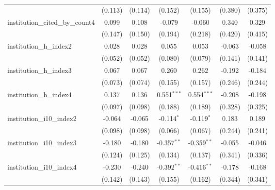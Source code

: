 \begin{tabular}{lcccccc}
                                         & (0.113)        & (0.114)        & (0.152)       & (0.155)       & (0.380)      & (0.375)\\   
   institution\_cited\_by\_count4        & 0.099          & 0.108          & -0.079        & -0.060        & 0.340        & 0.329\\   
                                         & (0.147)        & (0.150)        & (0.194)       & (0.218)       & (0.420)      & (0.415)\\   
   institution\_h\_index2                & 0.028          & 0.028          & 0.055         & 0.053         & -0.063       & -0.058\\   
                                         & (0.052)        & (0.052)        & (0.080)       & (0.079)       & (0.141)      & (0.141)\\   
   institution\_h\_index3                & 0.067          & 0.067          & 0.260         & 0.262         & -0.192       & -0.184\\   
                                         & (0.073)        & (0.074)        & (0.155)       & (0.157)       & (0.246)      & (0.244)\\   
   institution\_h\_index4                & 0.137          & 0.136          & 0.551$^{***}$ & 0.554$^{***}$ & -0.208       & -0.198\\   
                                         & (0.097)        & (0.098)        & (0.188)       & (0.189)       & (0.328)      & (0.325)\\   
   institution\_i10\_index2              & -0.064         & -0.065         & -0.114$^{*}$  & -0.119$^{*}$  & 0.183        & 0.189\\   
                                         & (0.098)        & (0.098)        & (0.066)       & (0.067)       & (0.244)      & (0.241)\\   
   institution\_i10\_index3              & -0.180         & -0.180         & -0.357$^{**}$ & -0.359$^{**}$ & -0.055       & -0.046\\   
                                         & (0.124)        & (0.125)        & (0.134)       & (0.137)       & (0.341)      & (0.336)\\   
   institution\_i10\_index4              & -0.230         & -0.240         & -0.392$^{**}$ & -0.416$^{**}$ & -0.178       & -0.168\\   
                                         & (0.142)        & (0.143)        & (0.155)       & (0.162)       & (0.344)      & (0.341)\\   

\end{tabular}
